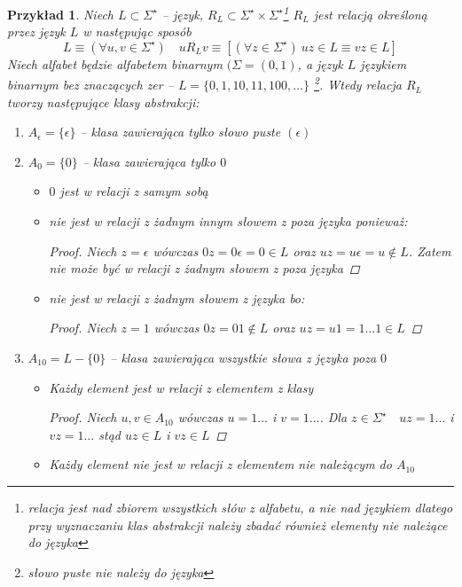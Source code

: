 \documentclass[12pt,a4paper]{article}
\newtheorem{przyklad}{Przykład}
\theoremstyle{definition}
\theoremstyle{remark}
\begin{document}
	\begin{przyklad}
		Niech $L \subset \Sigma^\star$ -- język, $R_L \subset \Sigma^\star \times \Sigma^\star$\footnote{relacja jest nad zbiorem wszystkich słów z alfabetu,
		a nie nad językiem dlatego przy wyznaczaniu klas abstrakcji należy zbadać również elementy nie należące do języka}
		$R_L$ jest relacją określoną przez język $L$ w następując sposób $$L \equiv (\forall u,v \in \Sigma^\star) \quad uR_Lv \equiv [(\forall z\in \Sigma^\star) ~
		uz \in L \equiv vz \in L ]  $$
		Niech alfabet będzie alfabetem binarnym $(\Sigma = (0, 1)$, a język $L$ językiem binarnym bez znaczących zer -- $L = \{0, 1, 10, 11, 100, \dots \}$
		\footnote{słowo puste nie należy do języka}. Wtedy relacja $R_L$ tworzy następujące klasy abstrakcji:
		\begin{enumerate}
			\item $A_\epsilon = \{\epsilon\}$ -- klasa zawierająca tylko słowo puste $(\epsilon)$ 
			\item $A_0 = \{0\}$ -- klasa zawierająca tylko $0$
				\begin{itemize}
					\item $0$ jest w relacji z samym sobą
					\item nie jest w relacji z żadnym innym słowem z poza języka ponieważ:
					\begin{proof}
						Niech $z = \epsilon$ wówczas $0z = 0\epsilon = 0 \in L$ oraz $uz = u\epsilon = u \not\in L$. Zatem nie może być w relacji z żadnym 
						słowem z poza języka
					\end{proof}
					\item nie jest w relacji z żadnym słowem z języka bo:
					\begin{proof}
						Niech $z = 1$ wówczas $0z = 01 \not\in L$ oraz $uz = u1 = 1\dots 1 \in L$
					\end{proof}
				\end{itemize}
			\item $A_{10} = L - \{0\}$ -- klasa zawierająca wszystkie słowa z języka poza $0$
				\begin{itemize}
					\item Każdy element jest w relacji z elementem z klasy
					\begin{proof}
						Niech $u, v \in A_{10}$ wówczas $u = 1\dots$ i $v = 1\dots$. Dla $z \in \Sigma^\star \quad uz = 1\dots$ i $vz = 1\dots$
						stąd $uz \in L$ i $vz \in L$
					\end{proof}
					\item Każdy element nie jest w relacji z elementem nie należącym do $A_{10}$

\end{itemize}
\end{enumerate}
\end{przyklad}
\end{document}

